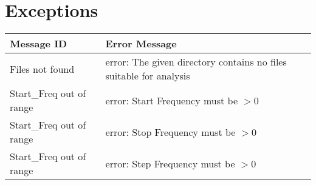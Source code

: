 \documentclass[12pt]{article}
\begin{document}
\newpage
\appendix
\section{Exceptions} \label{appx}

\begin{table}[!h]
\caption{Possible Exceptions} \label{TblInputVar}
\renewcommand{\arraystretch}{1.2}
\noindent \begin{longtable*}{l l} 
  \toprule
  \textbf{Message ID} & \textbf{Error Message}\\
  \midrule
Files not found				& error: The given directory contains no files 
suitable for analysis\\
Start\_Freq out of range	& error: Start Frequency must be $> 0$\\
Start\_Freq out of range	& error: Stop Frequency must be $> 0$\\
Start\_Freq out of range	& error: Step Frequency must be $> 0$\\
  \bottomrule
\end{longtable*}
\end{table}
\end{document}
